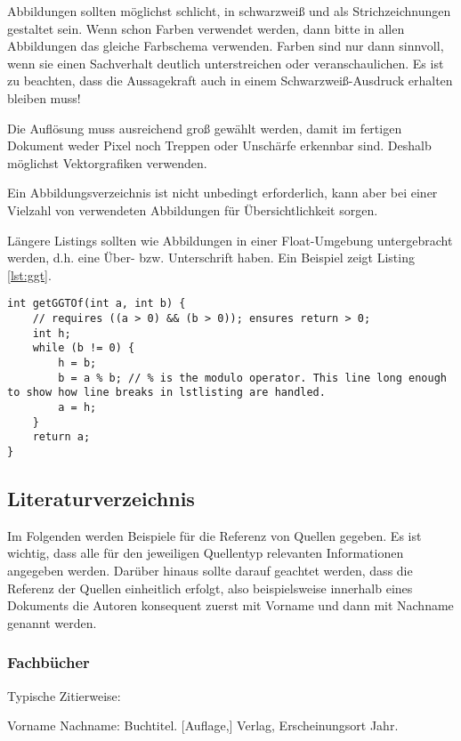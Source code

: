 \documentclass[12pt]{scrartcl}
\begin{document}
Abbildungen sollten möglichst schlicht, in schwarzweiß und als Strichzeichnungen gestaltet sein. Wenn schon Farben verwendet werden, dann bitte in allen Abbildungen das gleiche Farbschema verwenden. Farben sind nur dann sinnvoll, wenn sie einen Sachverhalt deutlich unterstreichen oder veranschaulichen. Es ist zu beachten, dass die Aussagekraft auch in einem Schwarzweiß-Ausdruck erhalten bleiben muss!

Die Auflösung muss ausreichend groß gewählt werden, damit im fertigen Dokument weder Pixel noch Treppen oder Unschärfe erkennbar sind. Deshalb möglichst Vektorgrafiken verwenden.

Ein Abbildungsverzeichnis ist nicht unbedingt erforderlich, kann aber bei einer Vielzahl von verwendeten Abbildungen für Übersichtlichkeit sorgen.

Längere Listings sollten wie Abbildungen in einer Float-Umgebung untergebracht werden, d.h. eine Über- bzw. Unterschrift haben. Ein Beispiel zeigt Listing \ref{lst:ggt}.

\begin{lstlisting}[float,caption={Berechnung des größten gemeinsamen Teilers zweier ganzer Zahlen a und b},label={lst:ggt}]
int getGGTOf(int a, int b) {
	// requires ((a > 0) && (b > 0)); ensures return > 0;
	int h;
	while (b != 0) {
		h = b;
		b = a % b; // % is the modulo operator. This line long enough to show how line breaks in lstlisting are handled.
		a = h;
	}
	return a;
}
\end{lstlisting}

\subsection{Literaturverzeichnis}

Im Folgenden werden Beispiele für die Referenz von Quellen gegeben. Es ist wichtig, dass alle für den jeweiligen Quellentyp relevanten Informationen angegeben werden. Darüber hinaus sollte darauf geachtet werden, dass die Referenz der Quellen einheitlich erfolgt, also beispielsweise innerhalb eines Dokuments die Autoren konsequent zuerst mit Vorname und dann mit Nachname genannt werden.

\subsubsection{Fachbücher}

Typische Zitierweise:

Vorname Nachname: Buchtitel. {[}Auflage,{]} Verlag, Erscheinungsort Jahr.
\end{document}

